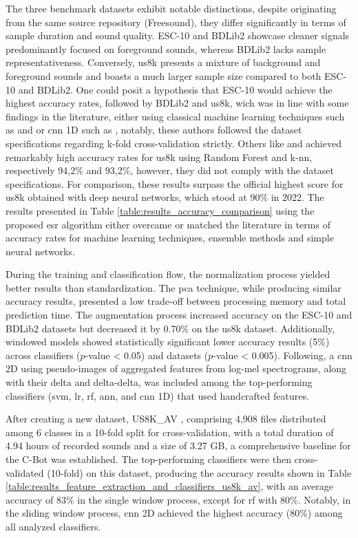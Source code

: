 The three benchmark datasets exhibit notable distinctions, despite originating from the same source repository (Freesound), they differ significantly in terms of sample duration and sound quality. ESC-10 and BDLib2 showcase cleaner signals predominantly focused on foreground sounds, whereas BDLib2 lacks sample representativeness. Conversely, \gls{us8k} presents a mixture of background and foreground sounds and boasts a much larger sample size compared to both ESC-10 and BDLib2. One could posit a hypothesis that ESC-10 would achieve the highest accuracy rates, followed by BDLib2 and \gls{us8k}, wich was in line with some findings in the literature, either using classical machine learning techniques such as \textcite{Silva2019} and \textcite{Bountourakis2019} or \gls{cnn} 1D such as \textcite{Vandendriessche2021}, notably, these authors followed the dataset specifications regarding k-fold cross-validation strictly. Others like \textcite{Lhoest2021} and \textcite{Luz2021} achieved remarkably high accuracy rates for \gls{us8k} using Random Forest and \gls{k-nn}, respectively 94,2\% and 93,2\%, however, they did not comply with the dataset specifications. For comparison, these results surpass the official highest score for \gls{us8k} obtained with deep neural networks, which stood at 90\% in 2022. The results presented in Table \ref{table:results_accuracy_comparison} using the proposed \gls{esr} algorithm either overcame or matched the literature in terms of accuracy rates for machine learning techniques, ensemble methods and simple neural networks.


During the training and classification flow, the normalization process yielded better results than standardization. The \gls{pca} technique, while producing similar accuracy results, presented a low trade-off between processing memory and total prediction time. The augmentation process increased accuracy on the ESC-10 and BDLib2 datasets but decreased it by 0.70\% on the \gls{us8k} dataset. Additionally, windowed models showed statistically significant lower accuracy results (5\%) across classifiers ($p$-value < 0.05) and datasets ($p$-value < 0.005). Following, a \gls{cnn} 2D using pseudo-images of aggregated features from log-mel spectrograms, along with their delta and delta-delta, was included among the top-performing classifiers (\gls{svm}, \gls{lr}, \gls{rf}, \gls{ann}, and \gls{cnn} 1D) that used handcrafted features.

After creating a new dataset, US8K\_AV \cite{florentino2024}, comprising 4,908 files distributed among 6 classes in a 10-fold split for cross-validation, with a total duration of 4.94 hours of recorded sounds and a size of 3.27 GB, a comprehensive baseline for the C-Bot was established. The top-performing classifiers were then cross-validated (10-fold) on this dataset, producing the accuracy results shown in Table \ref{table:results_feature_extraction_and_classifiers_us8k_av}, with an average accuracy of 83\% in the single window process, except for \gls{rf} with 80\%. Notably, in the sliding window process, \gls{cnn} 2D achieved the highest accuracy (80\%) among all analyzed classifiers.

